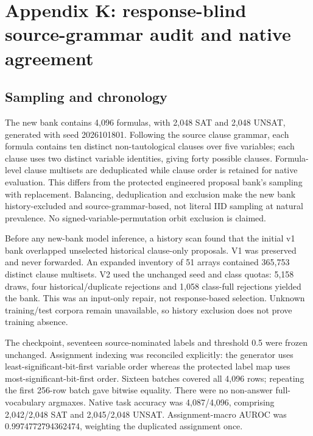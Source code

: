\documentclass[
  british,
  11pt,
  a4paper,
]{article}
\begin{document}
\section{Appendix K: response-blind source-grammar audit and native
agreement}\label{appendix-k-response-blind-source-grammar-audit-and-native-agreement}

\subsection{Sampling and chronology}\label{sampling-and-chronology}

The new bank contains 4,096 formulas, with 2,048 SAT and 2,048 UNSAT,
generated with seed 2026101801. Following the source clause grammar,
each formula contains ten distinct non-tautological clauses over five
variables; each clause uses two distinct variable identities, giving
forty possible clauses. Formula-level clause multisets are deduplicated
while clause order is retained for native evaluation. This differs from
the protected engineered proposal bank's sampling with replacement.
Balancing, deduplication and exclusion make the new bank
history-excluded and source-grammar-based, not literal IID sampling at
natural prevalence. No signed-variable-permutation orbit exclusion is
claimed.

Before any new-bank model inference, a history scan found that the
initial v1 bank overlapped unselected historical clause-only proposals.
V1 was preserved and never forwarded. An expanded inventory of 51 arrays
contained 365,753 distinct clause multisets. V2 used the unchanged seed
and class quotas: 5,158 draws, four historical/duplicate rejections and
1,058 class-full rejections yielded the bank. This was an input-only
repair, not response-based selection. Unknown training/test corpora
remain unavailable, so history exclusion does not prove training
absence.

The checkpoint, seventeen source-nominated labels and threshold 0.5 were
frozen unchanged. Assignment indexing was reconciled explicitly: the
generator uses least-significant-bit-first variable order whereas the
protected label map uses most-significant-bit-first order. Sixteen
batches covered all 4,096 rows; repeating the first 256-row batch gave
bitwise equality. There were no non-answer full-vocabulary argmaxes.
Native task accuracy was 4,087/4,096, comprising 2,042/2,048 SAT and
2,045/2,048 UNSAT. Assignment-macro AUROC was 0.9974772794362474,
weighting the duplicated assignment once.
\end{document}
